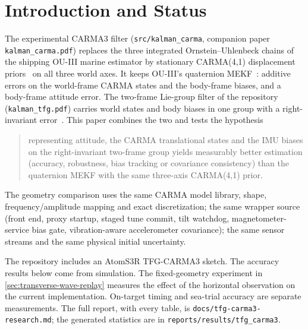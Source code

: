 \documentclass[conference]{IEEEtran}
\theoremstyle{bodysmall}
\begin{document}
\section{Introduction and Status}
\label{sec:intro}
The experimental CARMA3 filter (\texttt{src/kalman\_carma}, companion paper
\texttt{kalman\_carma.pdf}) replaces the three integrated Ornstein--Uhlenbeck
chains of the shipping OU-III marine estimator by stationary CARMA(4,1)
displacement priors~\cite{brockwell01} on all three world axes. It keeps
OU-III's quaternion MEKF~\cite{markley03}: additive errors on the world-frame
CARMA states and the body-frame biases, and a body-frame attitude error. The
two-frame Lie-group filter of the repository (\texttt{kalman\_tfg.pdf}) carries
world states and body biases in one group with a right-invariant
error~\cite{barrau17,barrau18}. This paper combines the two and tests the
hypothesis
\begin{quote}\small
representing attitude, the CARMA translational states and the IMU biases on
the right-invariant two-frame group yields measurably better estimation
(accuracy, robustness, bias tracking or covariance consistency) than the
quaternion MEKF with the same three-axis CARMA(4,1) prior.
\end{quote}
The geometry comparison uses the same CARMA model library, shape,
frequency/amplitude mapping and exact discretization; the same wrapper source
(front end, proxy startup, staged tune commit, tilt watchdog,
magnetometer-service bias gate, vibration-aware accelerometer covariance); the
same sensor streams and the same physical initial uncertainty.

The repository includes an AtomS3R TFG-CARMA3 sketch. The accuracy results
below come from simulation. The fixed-geometry experiment in
\cref{sec:transverse-wave-replay} measures the effect of the horizontal
observation on the current implementation. On-target timing and sea-trial
accuracy are separate measurements. The full
report, with every table, is \texttt{docs/tfg-carma3-research.md}; the
generated statistics are in \texttt{reports/results/tfg\_carma3}.
\end{document}
